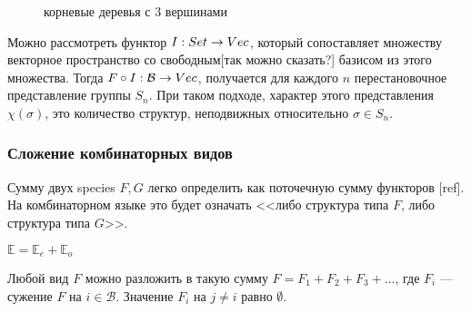 \begin{figure}
\begin{center}
\end{center}
\caption{корневые деревья с 3 вершинами}
\label{pic:3-rooted-trees}
\end{figure}

Можно рассмотреть функтор $I:Set \rightarrow Vec$, который сопоставляет множеству
векторное пространство со свободным[так можно сказать?] базисом из этого
множества.
Тогда $F \circ I: \mathcal B \rightarrow Vec$, получается для каждого $n$
перестановочное представление группы $S_n$. При таком подходе, характер этого
представления $\chi(\sigma)$, это количество структур, неподвижных относительно $\sigma \in S_n$.

\subsubsection{Сложение комбинаторных видов}
Сумму двух species $F, G$ легко определить как поточечную сумму функторов [ref].
На комбинаторном языке это будет означать <<либо структура типа $F$, либо
структура типа $G$>>. 
\begin{example}
$\mathbb E = \mathbb E_e + \mathbb E_o$
\end{example}
\begin{example}
Любой вид $F$ можно разложить в такую сумму $F =
F_{1} + F_{2} + F_{3} + \dots$, где $F_{i}$ --- сужение $F$ на $i \in \mathcal
B$. Значение $F_{i}$ на $j \neq i$ равно $\emptyset$.
\end{example}

